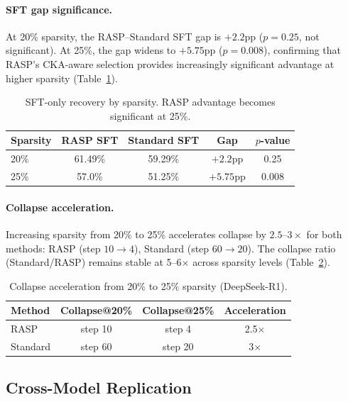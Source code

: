 \documentclass[11pt]{article}
\begin{document}
\paragraph{SFT gap significance.}
At 20\% sparsity, the RASP--Standard SFT gap is $+2.2$pp ($p{=}0.25$, not significant).
At 25\%, the gap widens to $+5.75$pp ($p{=}0.008$), confirming that RASP's CKA-aware selection provides increasingly significant advantage at higher sparsity (Table~\ref{tab:sft_only}).

\begin{table}[t]
\centering
\caption{SFT-only recovery by sparsity. RASP advantage becomes significant at 25\%.}
\label{tab:sft_only}
\begin{tabular}{lcccc}
\toprule
\textbf{Sparsity} & \textbf{RASP SFT} & \textbf{Standard SFT} & \textbf{Gap} & \textbf{$p$-value} \\
\midrule
20\% & 61.49\% & 59.29\% & $+2.2$pp  & 0.25 \\
25\% & 57.0\%  & 51.25\% & $+5.75$pp & 0.008 \\
\bottomrule
\end{tabular}
\end{table}

\paragraph{Collapse acceleration.}
Increasing sparsity from 20\% to 25\% accelerates collapse by $2.5$--$3\times$ for both methods: RASP (step $10 \to 4$), Standard (step $60 \to 20$).
The collapse ratio (Standard/RASP) remains stable at 5--6$\times$ across sparsity levels (Table~\ref{tab:collapse_acceleration}).

\begin{table}[t]
\centering
\caption{Collapse acceleration from 20\% to 25\% sparsity (DeepSeek-R1).}
\label{tab:collapse_acceleration}
\begin{tabular}{lccc}
\toprule
\textbf{Method} & \textbf{Collapse@20\%} & \textbf{Collapse@25\%} & \textbf{Acceleration} \\
\midrule
RASP     & step 10 & step 4  & 2.5$\times$ \\
Standard & step 60 & step 20 & 3$\times$ \\
\bottomrule
\end{tabular}
\end{table}

\subsection{Cross-Model Replication}
\label{sec:cross_model}
\end{document}
